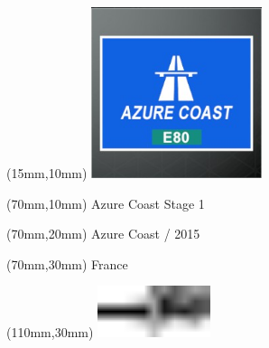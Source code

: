 \null\newpage
\begin{textblock*}{50mm}(15mm,10mm)%
\includegraphics[width=50mm]{LG/2015-05-20_00073.png}
\end{textblock*}
\begin{textblock*}{130mm}(70mm,10mm)%
{\fontsize{20}{20}\selectfont Azure Coast Stage 1}\\
\end{textblock*}
\begin{textblock*}{120mm}(70mm,20mm)%
{\fontsize{16}{16}\selectfont Azure Coast / 2015}\\
\end{textblock*}
\begin{textblock*}{120mm}(70mm,30mm)%
{\fontsize{12}{12}\selectfont France}
\end{textblock*}
\begin{textblock*}{30mm}(110mm,30mm)%
\centering
\includegraphics[height=15mm]{icons/tofinish.pdf}
\end{textblock*}
